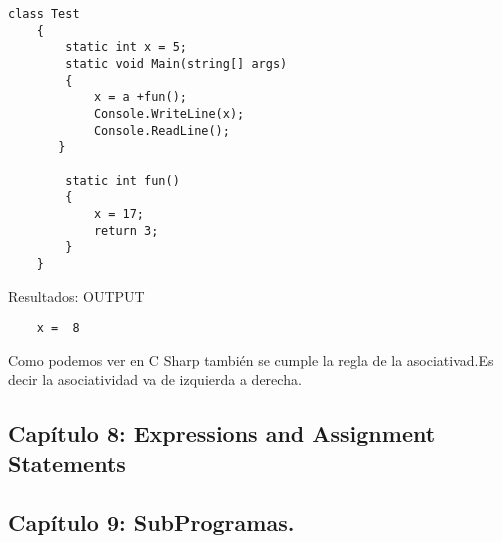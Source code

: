 \documentclass[11pt]{article}
\begin{document}
\begin{lstlisting}[frame=single]
class Test
    {
        static int x = 5;
        static void Main(string[] args)
        {
            x = a +fun();
            Console.WriteLine(x);
            Console.ReadLine();
       }

        static int fun()
        {
            x = 17;
            return 3;
        }
    }
\end{lstlisting}

\noindent Resultados:
OUTPUT\\
\begin{verbatim}
	x =  8
\end{verbatim}

Como podemos ver en C Sharp también se cumple la regla de la asociativad.Es decir la asociatividad va de izquierda a derecha.


\subsection{Capítulo 8: Expressions and Assignment Statements}

\subsection{Capítulo 9: SubProgramas.}


        
\end{document}
